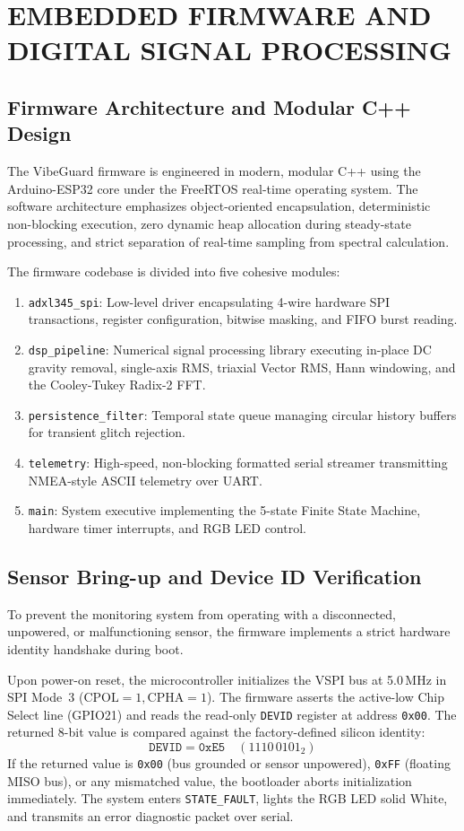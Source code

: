 \chapter{EMBEDDED FIRMWARE AND DIGITAL SIGNAL PROCESSING}
\label{ch:firmware_dsp}

\section{Firmware Architecture and Modular C++ Design}
The VibeGuard firmware is engineered in modern, modular C++ using the Arduino-ESP32 core under the FreeRTOS real-time operating system. The software architecture emphasizes object-oriented encapsulation, deterministic non-blocking execution, zero dynamic heap allocation during steady-state processing, and strict separation of real-time sampling from spectral calculation.

The firmware codebase is divided into five cohesive modules:
\begin{enumerate}
    \item \texttt{adxl345\_spi}: Low-level driver encapsulating 4-wire hardware SPI transactions, register configuration, bitwise masking, and FIFO burst reading.
    \item \texttt{dsp\_pipeline}: Numerical signal processing library executing in-place DC gravity removal, single-axis RMS, triaxial Vector RMS, Hann windowing, and the Cooley-Tukey Radix-2 FFT.
    \item \texttt{persistence\_filter}: Temporal state queue managing circular history buffers for transient glitch rejection.
    \item \texttt{telemetry}: High-speed, non-blocking formatted serial streamer transmitting NMEA-style ASCII telemetry over UART.
    \item \texttt{main}: System executive implementing the 5-state Finite State Machine, hardware timer interrupts, and RGB LED control.
\end{enumerate}

\section{Sensor Bring-up and Device ID Verification}
To prevent the monitoring system from operating with a disconnected, unpowered, or malfunctioning sensor, the firmware implements a strict hardware identity handshake during boot.

Upon power-on reset, the microcontroller initializes the VSPI bus at 5.0\,MHz in SPI Mode~3 ($\mathrm{CPOL}=1, \mathrm{CPHA}=1$). The firmware asserts the active-low Chip Select line (GPIO21) and reads the read-only \texttt{DEVID} register at address \texttt{0x00}. The returned 8-bit value is compared against the factory-defined silicon identity:
\begin{equation}
\texttt{DEVID} = \texttt{0xE5} \quad (1110\,0101_2)
\end{equation}
If the returned value is \texttt{0x00} (bus grounded or sensor unpowered), \texttt{0xFF} (floating MISO bus), or any mismatched value, the bootloader aborts initialization immediately. The system enters \texttt{STATE\_FAULT}, lights the RGB LED solid White, and transmits an error diagnostic packet over serial.

